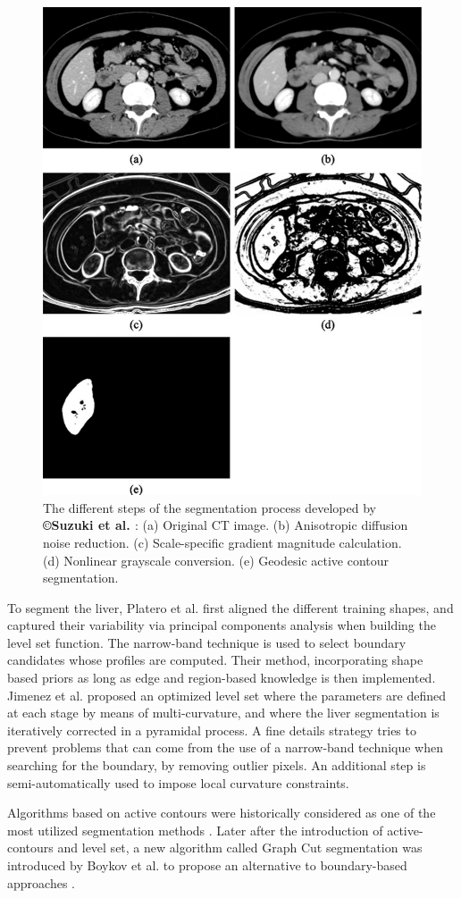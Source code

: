 \begin{figure}[ht!]
	\centering
	\includegraphics[width=0.5\linewidth]{images/Suzuki2010_Fig3}
	\caption{The different steps of the segmentation process developed by \textbf{©Suzuki et al. \cite{Suzuki2010}}: (a) Original CT image. (b) Anisotropic diffusion noise reduction. (c) Scale-specific gradient magnitude calculation. (d) Nonlinear grayscale conversion. (e) Geodesic active contour segmentation.}
	\label{Suzuki2010_Fig3}
\end{figure}


To segment the liver, Platero et al. \cite{Platero2011} first aligned the different training shapes, and captured
their variability via principal components analysis when building the
level set function. The narrow-band technique is used to select boundary
candidates whose profiles are computed. Their method, incorporating
shape based priors as long as edge and region-based knowledge is then
implemented.
Jimenez et al. \cite{Jimenez-Carretero2011} proposed an optimized level set where the parameters are
defined at each stage by means of multi-curvature, and where the liver
segmentation is iteratively corrected in a pyramidal process. A fine
details strategy tries to prevent problems that can come from the use of
a narrow-band technique when searching for the boundary, by removing
outlier pixels. An additional step is semi-automatically used to impose
local curvature constraints.

Algorithms based on active contours were historically considered as one
of the most utilized segmentation methods \cite{Moghbel2018}. Later after the introduction
of active-contours and level set, a new algorithm called Graph Cut
segmentation was introduced by Boykov et al. to propose an alternative to boundary-based approaches \cite{Boykov2001}.

